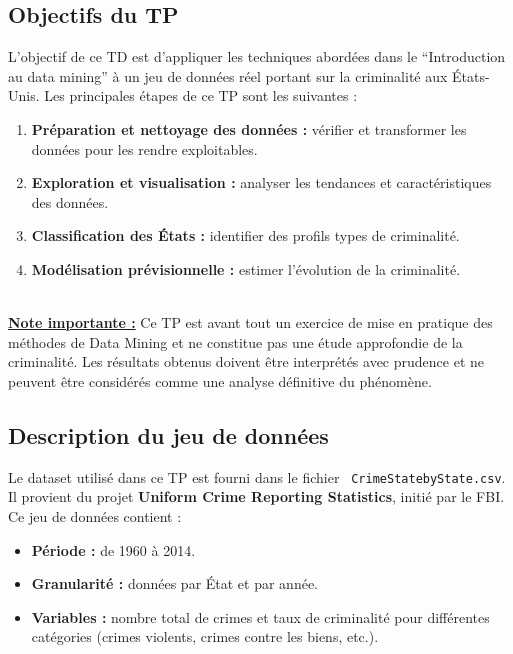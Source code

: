 \documentclass[a4paper,14pt]{article}
\begin{document}
    \subsection*{Objectifs du TP}

    L'objectif de ce TD est d'appliquer les techniques abordées dans le “Introduction au data mining” à un jeu de données réel portant sur la criminalité aux États-Unis. Les principales étapes de ce TP sont les suivantes :
    \begin{enumerate}[leftmargin=*, label=\arabic*)]
        \item \textbf{Préparation et nettoyage des données :} vérifier et transformer les données pour les rendre exploitables.
        \item \textbf{Exploration et visualisation :} analyser les tendances et caractéristiques des données.
        \item \textbf{Classification des États :} identifier des profils types de criminalité.
        \item \textbf{Modélisation prévisionnelle :} estimer l'évolution de la criminalité.
    \end{enumerate}\\

    \textbf{\underline{Note importante :}} Ce TP est avant tout un exercice de mise en pratique des méthodes de Data Mining et ne constitue pas une étude approfondie de la criminalité. Les résultats obtenus doivent être interprétés avec prudence et ne peuvent être considérés comme une analyse définitive du phénomène.
    
    \vspace{1cm}
    \subsection*{Description du jeu de données}
    Le dataset utilisé dans ce TP est fourni dans le fichier \texttt{ CrimeStatebyState.csv}. Il provient du projet \textbf{Uniform Crime Reporting Statistics}, initié par le FBI. Ce jeu de données contient :
   \begin{itemize} 
        \item \textbf{Période :} de 1960 à 2014.
        \item \textbf{Granularité :} données par État et par année.
        \item \textbf{Variables :} nombre total de crimes et taux de criminalité pour différentes catégories (crimes violents, crimes contre les biens, etc.).
    \end{itemize}
    
\end{document}
